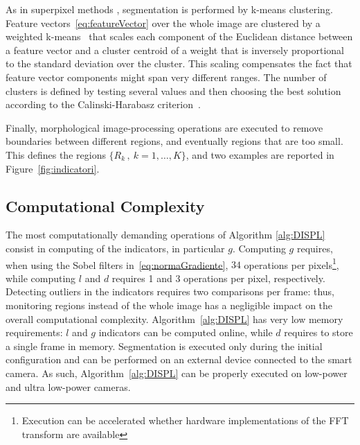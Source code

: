 \documentclass{llncs}
\newcommand{\gi}[1]{{\textcolor{red}{[\small \textbf{Giacomo}: #1]}}}
\begin{document}
As in superpixel methods \cite{Susstrunk2012}, segmentation is performed by k-means clustering. Feature vectors~\eqref{eq:featureVector} over the whole image are clustered by a weighted k-means~\cite{kottke1994motion} that scales each component of the Euclidean distance between a feature vector and a cluster centroid of a weight that is inversely proportional to the standard deviation over the cluster. This scaling compensates the fact that feature vector components might span very different ranges. The number of clusters is defined by testing several values and then choosing the best solution according to the Calinski-Harabasz criterion~\cite{calinski1974dendrite}.



Finally, morphological image-processing operations are executed to remove boundaries between different regions, and eventually regions that are too small. This defines the regions $\{R_k\,, \ k=1,\dots,K\}$, and two examples are reported in Figure~\ref{fig:indicatori}.

\subsection{Computational Complexity}\label{subsec:coputationalComplexity}

The most computationally demanding operations of Algorithm \ref{alg:DISPL} consist in computing of the indicators, in particular $g$. Computing $g$ requires, when using the Sobel filters in~\eqref{eq:normaGradiente}, $34$ operations per pixels\footnote{Execution can be accelerated whether hardware implementations of the FFT transform are available}, while computing $l$ and $d$ requires 1 and 3 operations per pixel, respectively. Detecting outliers in the indicators requires two comparisons per frame: thus, monitoring regions instead of the whole image has a negligible impact on the overall computational complexity. Algorithm~\ref{alg:DISPL} has very low memory requirements: $l$ and $g$ indicators can be computed online, while $d$ requires to store a single frame in memory. Segmentation is executed only during the initial configuration and can be performed on an external device connected to the smart camera. As such, Algorithm~\ref{alg:DISPL} can be properly executed on low-power and ultra low-power cameras.
\vspace{-0.2cm}
\end{document}
